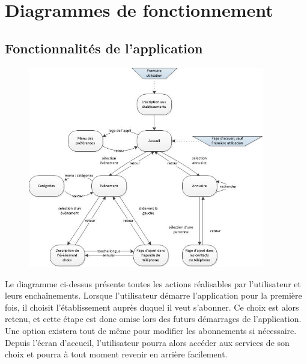 \chapter{Diagrammes de fonctionnement}

\section{Fonctionnalités de l'application}

\begin{figure}[h]
  \center
  \includegraphics[width=0.92\textwidth]{resources/features1.jpg}
\end{figure}

\newpage

Le diagramme ci-dessus présente toutes les actions réalisables par l'utilisateur et leurs enchaînements.
Lorsque l'utilisateur démarre l'application pour la première fois, il choisit l'établissement auprès duquel il veut s'abonner.
Ce choix est alors retenu, et cette étape est donc omise lors des futurs démarrages de l'application. Une option existera tout de même pour modifier les abonnements si nécessaire. Depuis l'écran d'accueil, l'utilisateur pourra alors accéder aux services de son choix et pourra à tout moment revenir en arrière facilement. \\

